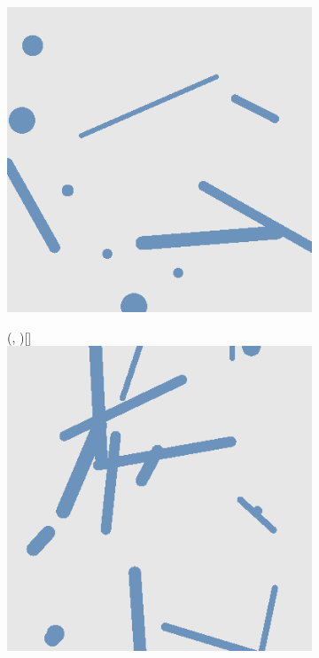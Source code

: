 \begin{figure}[H]
\begin{subfigure}{\w}
{            \includegraphics[width=\linewidth]{figures/generated-worlds/world_1.png}
        }
    \end{subfigure}
    \hspace*{\fill}
    \begin{subfigure}{\w}
        \makebox(\textwidth, \textwidth)[\textwidth]{
            \includegraphics[width=\linewidth]{figures/generated-worlds/world_2.png}
}
\end{subfigure}
\end{figure}

